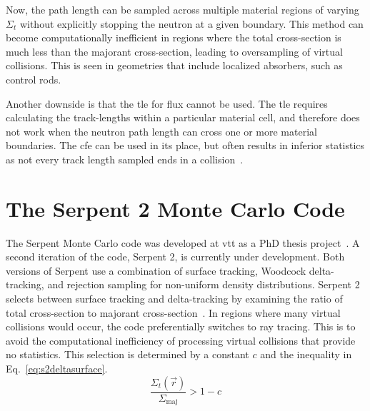 Now, the path length can be sampled across multiple material regions
of varying $\Sigma_t$ without explicitly stopping the neutron at a
given boundary. 
This method can become computationally inefficient in
regions where the total cross-section is much less than the majorant
cross-section, leading to oversampling of virtual collisions. This is
seen in geometries that include localized absorbers, such as control
rods. 

Another downside is that the \gls{tle} for
flux cannot be used. 
The \gls{tle} requires calculating the track-lengths
within a particular material cell, and therefore does not work when
the neutron path length can cross one or more material
boundaries. The \gls{cfe} can be used in its
place, but often results in inferior statistics as not every track
length sampled ends in a collision~\cite{leppanen2013}.

\section{The Serpent 2 Monte Carlo Code}
\label{sec:serpent2}

The Serpent Monte Carlo code was developed at \gls{vtt} as a PhD
thesis project~\cite{leppanen2007}. A second iteration of the code,
Serpent 2, is currently under development. Both versions of Serpent use a combination of surface tracking, Woodcock
delta-tracking, and rejection sampling for non-uniform density
distributions. Serpent 2 selects between surface tracking and
delta-tracking by examining the ratio of total cross-section to
majorant cross-section~\cite{leppanen2010}. In regions where many
virtual collisions would occur, the code preferentially switches to
ray tracing. This is to avoid the computational inefficiency of
processing virtual collisions that provide no statistics. This
selection is determined by a constant $c$ and the inequality in
Eq.~\eqref{eq:s2deltasurface}.
\begin{equation}
  \label{eq:s2deltasurface}
  \frac{\Sigma_t(\vec{r})}{\Sigma_\mathrm{maj}} > 1 - c
\end{equation}

